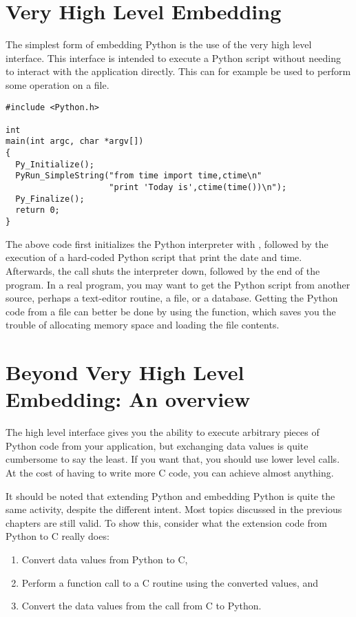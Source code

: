 \section{Very High Level Embedding
         \label{high-level-embedding}}

The simplest form of embedding Python is the use of the very
high level interface. This interface is intended to execute a
Python script without needing to interact with the application
directly. This can for example be used to perform some operation
on a file.

\begin{verbatim}
#include <Python.h>

int
main(int argc, char *argv[])
{
  Py_Initialize();
  PyRun_SimpleString("from time import time,ctime\n"
                     "print 'Today is',ctime(time())\n");
  Py_Finalize();
  return 0;
}
\end{verbatim}

The above code first initializes the Python interpreter with
, followed by the execution of a hard-coded
Python script that print the date and time.  Afterwards, the
 call shuts the interpreter down, followed by
the end of the program.  In a real program, you may want to get the
Python script from another source, perhaps a text-editor routine, a
file, or a database.  Getting the Python code from a file can better
be done by using the  function, which
saves you the trouble of allocating memory space and loading the file
contents.


\section{Beyond Very High Level Embedding: An overview
         \label{lower-level-embedding}}

The high level interface gives you the ability to execute
arbitrary pieces of Python code from your application, but
exchanging data values is quite cumbersome to say the least. If
you want that, you should use lower level calls. At the cost of
having to write more C code, you can achieve almost anything.

It should be noted that extending Python and embedding Python
is quite the same activity, despite the different intent. Most
topics discussed in the previous chapters are still valid. To
show this, consider what the extension code from Python to C
really does:

\begin{enumerate}
    \item Convert data values from Python to C,
    \item Perform a function call to a C routine using the
        converted values, and
    \item Convert the data values from the call from C to Python.
\end{enumerate}

